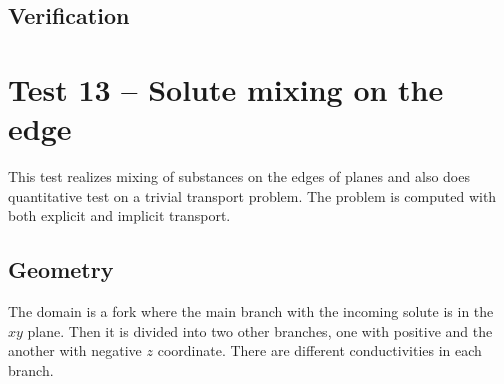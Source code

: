 \subsection*{Verification}




\section{Test 13 -- Solute mixing on the edge}
This test realizes mixing of substances on the edges of planes and also does quantitative test on a trivial transport problem. The problem is computed with both explicit and implicit transport.

\subsection*{Geometry}
The domain is a fork where the main branch with the incoming solute is in the $xy$ plane. Then it is divided into two other branches, one with positive and the another with negative $z$ coordinate. There are different conductivities in each branch.

